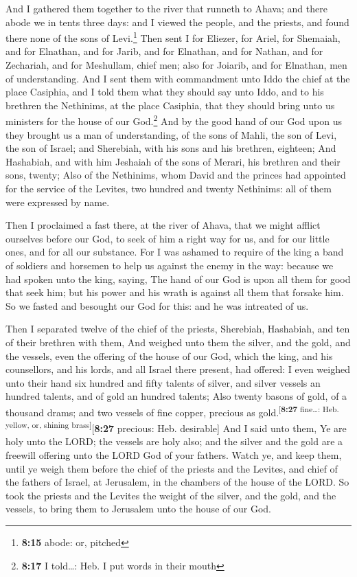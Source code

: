  And I gathered them together to the river that runneth
to Ahava; and there abode we in tents three days: and I viewed the
people, and the priests, and found there none of the sons of
Levi.\footnote{\textbf{8:15} abode: or, pitched}  Then
sent I for Eliezer, for Ariel, for Shemaiah, and for Elnathan, and for
Jarib, and for Elnathan, and for Nathan, and for Zechariah, and for
Meshullam, chief men; also for Joiarib, and for Elnathan, men of
understanding.  And I sent them with commandment unto
Iddo the chief at the place Casiphia, and I told them what they should
say unto Iddo, and to his brethren the Nethinims, at the place Casiphia,
that they should bring unto us ministers for the house of our
God.\footnote{\textbf{8:17} I told\ldots: Heb. I put words in their
  mouth}  And by the good hand of our God upon us they
brought us a man of understanding, of the sons of Mahli, the son of
Levi, the son of Israel; and Sherebiah, with his sons and his brethren,
eighteen;  And Hashabiah, and with him Jeshaiah of the
sons of Merari, his brethren and their sons, twenty; 
Also of the Nethinims, whom David and the princes had appointed for the
service of the Levites, two hundred and twenty Nethinims: all of them
were expressed by name.

 Then I proclaimed a fast there, at the river of Ahava,
that we might afflict ourselves before our God, to seek of him a right
way for us, and for our little ones, and for all our substance.
 For I was ashamed to require of the king a band of
soldiers and horsemen to help us against the enemy in the way: because
we had spoken unto the king, saying, The hand of our God is upon all
them for good that seek him; but his power and his wrath is against all
them that forsake him.  So we fasted and besought our God
for this: and he was intreated of us.

 Then I separated twelve of the chief of the priests,
Sherebiah, Hashabiah, and ten of their brethren with them,
 And weighed unto them the silver, and the gold, and the
vessels, even the offering of the house of our God, which the king, and
his counsellors, and his lords, and all Israel there present, had
offered:  I even weighed unto their hand six hundred and
fifty talents of silver, and silver vessels an hundred talents, and of
gold an hundred talents;  Also twenty basons of gold, of
a thousand drams; and two vessels of fine copper, precious as
gold.\textsuperscript{{[}\textbf{8:27} fine\ldots: Heb. yellow, or,
shining brass{]}}{[}\textbf{8:27} precious: Heb. desirable{]}
 And I said unto them, Ye are holy unto the LORD; the
vessels are holy also; and the silver and the gold are a freewill
offering unto the LORD God of your fathers.  Watch ye,
and keep them, until ye weigh them before the chief of the priests and
the Levites, and chief of the fathers of Israel, at Jerusalem, in the
chambers of the house of the LORD.  So took the priests
and the Levites the weight of the silver, and the gold, and the vessels,
to bring them to Jerusalem unto the house of our God.

